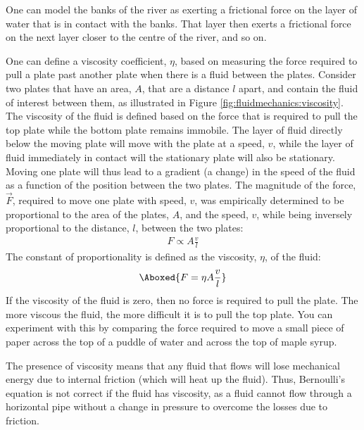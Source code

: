 {{One can model the banks of the river as exerting a frictional force on the layer of water that is in contact with the banks. That layer then exerts a frictional force on the next layer closer to the centre of the river, and so on. 

One can define a viscosity coefficient, $\eta$, based on measuring the force required to pull a plate past another plate when there is a fluid between the plates. Consider two plates that have an area, $A$, that are a distance $l$ apart, and contain the fluid of interest between them, as illustrated in Figure \ref{fig:fluidmechanics:viscosity}.
The viscosity of the fluid is defined based on the force that is required to pull the top plate while the bottom plate remains immobile. The layer of fluid directly below the moving plate will move with the plate at a speed, $v$, while the layer of fluid immediately in contact will the stationary plate will also be stationary. Moving one plate will thus lead to a gradient (a change) in the speed of the fluid as a function of the position between the two plates. The magnitude of the force, $\vec F$,  required to move one plate with speed, $v$, was empirically determined to be proportional to the area of the plates, $A$, and the speed, $v$, while being inversely proportional to the distance, $l$, between the two plates:
\begin{align*}
F \propto A\frac{v}{l}
\end{align*}
The constant of proportionality is defined as the viscosity, $\eta$, of the fluid:
\begin{align}
\Aboxed{F = \eta A\frac{v}{l}}
\end{align}
If the viscosity of the fluid is zero, then no force is required to pull the plate. The more viscous the fluid, the more difficult it is to pull the top plate. You can experiment with this by comparing the force required to move a small piece of paper across the top of a puddle of water and across the top of maple syrup.

The presence of viscosity means that any fluid that flows will lose mechanical energy due to internal friction (which will heat up the fluid). Thus, Bernoulli's equation is not correct if the fluid has viscosity, as a fluid cannot flow through a horizontal pipe without a change in pressure to overcome the losses due to friction.

}}
